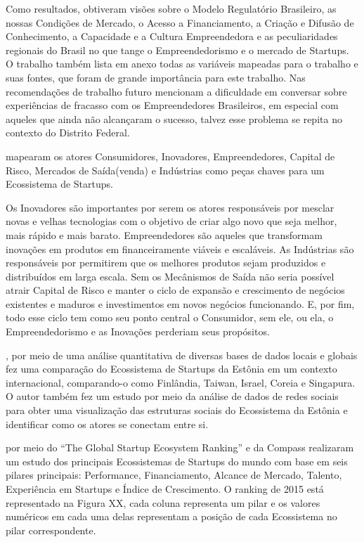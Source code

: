 Como resultados, obtiveram visões sobre o Modelo Regulatório Brasileiro, as nossas Condições de Mercado, o Acesso a Financiamento, a Criação e Difusão de Conhecimento, a Capacidade e a Cultura Empreendedora e as peculiaridades regionais do Brasil no que tange o Empreendedorismo e o mercado de Startups. O trabalho também lista em anexo todas as variáveis mapeadas para o trabalho e suas fontes, que foram de grande importância para este trabalho. Nas recomendações de trabalho futuro mencionam a dificuldade em conversar sobre experiências de fracasso com os Empreendedores Brasileiros, em especial com aqueles que ainda não alcançaram o sucesso, talvez esse problema se repita no contexto do Distrito Federal.

 mapearam os atores Consumidores, Inovadores, Empreendedores, Capital de Risco, Mercados de Saída(venda) e Indústrias como peças chaves para um Ecossistema de Startups. 

Os Inovadores são importantes por serem os atores responsáveis por mesclar novas e velhas tecnologias com o objetivo de criar algo novo que seja melhor, mais rápido e mais barato. Empreendedores são aqueles que transformam inovações em produtos em financeiramente viáveis e escaláveis. As Indústrias são responsáveis por permitirem que os melhores produtos sejam produzidos e distribuídos em larga escala. Sem os Mecânismos de Saída não seria possível atrair Capital de Risco e manter o ciclo de expansão e crescimento de negócios existentes e maduros e investimentos em novos negócios funcionando. E, por fim, todo esse ciclo tem como seu ponto central o Consumidor, sem ele, ou ela, o Empreendedorismo e as Inovações perderiam seus propósitos.

, por meio de uma análise quantitativa de diversas bases de dados locais e globais fez uma comparação do Ecossistema de Startups da Estônia em um contexto internacional, comparando-o como Finlândia, Taiwan, Israel, Coreia e Singapura. O autor também fez um estudo por meio da análise de dados de redes sociais para obter uma visualização das estruturas sociais do Ecossistema da Estônia e identificar como os atores se conectam entre si.

 por meio do ``The Global Startup Ecosystem Ranking'' e da Compass realizaram um estudo dos principais Ecossistemas de Startups do mundo com base em seis pilares principais: Performance, Financiamento, Alcance de Mercado, Talento, Experiência em Startups e Índice de Crescimento. O ranking de 2015 está representado na Figura XX, cada coluna representa um pilar e os valores numéricos em cada uma delas representam a posição de cada Ecossistema no pilar correspondente. 

